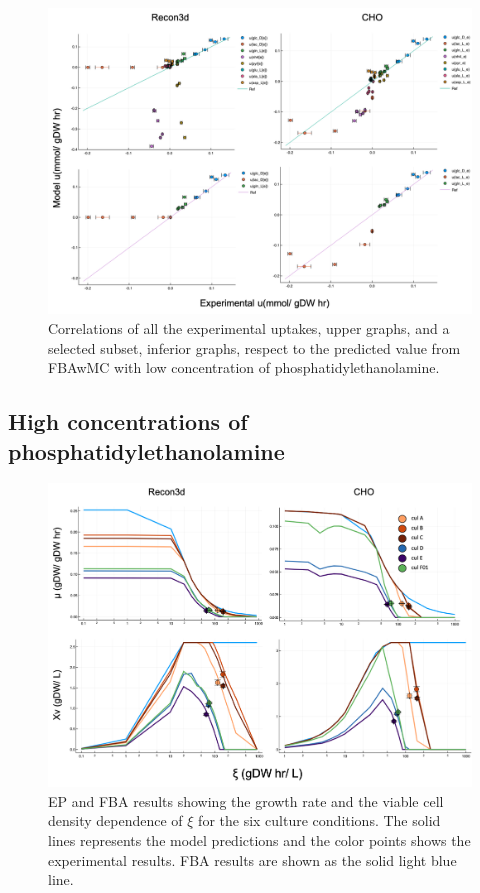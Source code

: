 \documentclass[]{article}
\begin{document}
	\begin{figure}[!h]
		\includegraphics[scale = 0.5]{low_medium_2}
		\caption{Correlations of all the experimental uptakes, upper graphs, and a selected subset, inferior graphs, respect to the predicted value from FBAwMC with low concentration of phosphatidylethanolamine.}
		
	\end{figure}

	\subsection{High concentrations of phosphatidylethanolamine} %
		
	\begin{figure}[h]
		\includegraphics[scale = 0.5]{rich_medium_1}
		\caption{EP and FBA results showing the growth rate and the viable cell density dependence of $\xi$ for the six culture conditions. The solid lines represents the model predictions and the color points shows the experimental results. FBA results are shown as the solid light blue line.}
		
	\end{figure}
\end{document}
